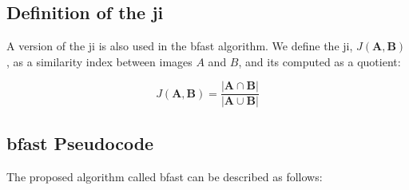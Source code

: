 \subsection{Definition of the \texorpdfstring{\gls{ji}}{JI}}

A version of the \gls{ji} is also used in the \gls{bfast} algorithm. We define the \gls{ji}, $J(\bm{A},\bm{B})$, as a similarity index between images $A$ and $B$, and its computed as a quotient:

\begin{equation}
J(\bm{A},\bm{B}) = \frac{|\bm{A} \cap \bm{B}|}{|\bm{A} \cup \bm{B}|}
\end{equation}

\subsection{\texorpdfstring{\gls{bfast}}{BFAST} Pseudocode}

The proposed algorithm called \gls{bfast} can be described as follows:

